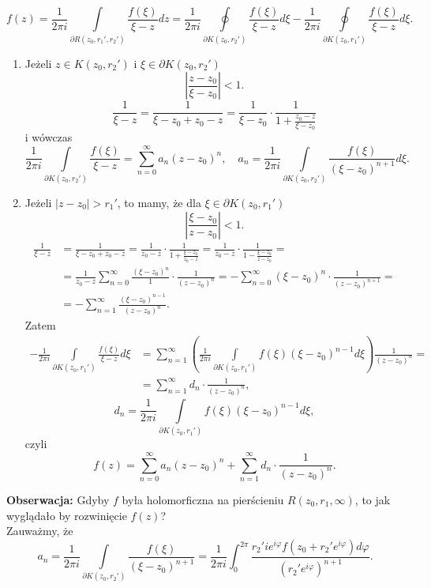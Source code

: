 \documentclass[../main.tex]{subfiles}
\begin{document}
    \[
        f(z) = \frac{1}{2\pi i}\int\limits_{\partial R(z_0,r_1',r_2')} \frac{f(\xi)}{\xi - z}dz = \frac{1}{2\pi i}\oint\limits_{\partial K(z_0,r_2')}\frac{f(\xi)}{\xi - z}d\xi - \frac{1}{2\pi i}\oint\limits_{\partial K(z_0,r_1')}\frac{f(\xi)}{\xi-z}d\xi
    .\]
\begin{enumerate}
    \item Jeżeli $z\in K(z_0,r_2')$ i $\xi\in\partial K(z_0,r_2')$
\[
    \left| \frac{z-z_0}{\xi-z_0} \right| < 1
.\]
\[
    \frac{1}{\xi - z} = \frac{1}{\xi - z_0 + z_0 - z} = \frac{1}{\xi - z_0}\cdot \frac{1}{1+ \frac{z_0-z}{\xi - z_0}}
\]
i wówczas
\[
    \frac{1}{2\pi i}\int\limits_{\partial K(z_0, r_2')}\frac{f(\xi)}{\xi - z} = \sum_{n=0}^{\infty} a_n (z-z_0)^n,\quad a_n = \frac{1}{2 \pi i}\int\limits_{\partial K(z_0,r_2')}\frac{f(\xi)}{(\xi - z_0)^{n+1}}d\xi
.\]
    \item Jeżeli $|z-z_0| > r_1'$, to mamy, że dla $\xi\in\partial K(z_0,r_1')$
        \[
            \left| \frac{\xi - z_0}{z-z_0} \right| < 1
        .\]
    \begin{align*}
        \frac{1}{\xi - z} &= \frac{1}{\xi - z_0 + z_0 - z} = \frac{1}{z_0 - z} \cdot \frac{1}{1 + \frac{\xi - z_0}{z_0 - z}} = \frac{1}{z_0 - z}\cdot \frac{1}{1 - \frac{\xi - z_0}{z - z_0}} =\\
        &= \frac{1}{z_0 - z}\sum_{n=0}^{\infty} \frac{(\xi - z_0)^n}{1} \cdot \frac{1}{(z-z_0)^n} = -\sum_{n=0}^{\infty} (\xi - z_0)^n \cdot \frac{1}{(z-z_0)^{n+1}} =\\
        &= -\sum_{n=1}^{\infty} \frac{(\xi - z_0)^{n-1}}{(z-z_0)^n}
    .\end{align*}
Zatem
\begin{align*}
    -\frac{1}{2\pi i}\int\limits_{\partial K(z_0,r_1')} \frac{f(\xi)}{\xi - z}d\xi &= \sum_{n=1}^{\infty} \left( \frac{1}{2\pi i }\int\limits_{\partial K(z_0,r_1')}f(\xi) (\xi - z_0)^{n-1}d\xi \right) \frac{1}{(z-z_0)^n} =\\
    &= \sum_{n=1}^{\infty} d_n \cdot \frac{1}{(z-z_0)^n}
,\end{align*}
\[
    d_n = \frac{1}{2\pi i}\int\limits_{\partial K(z_0,r_1')}f(\xi)(\xi - z_0)^{n-1}d\xi
,\]
czyli
\[
    f(z) = \sum_{n=0}^{\infty} a_n (z-z_0)^n + \sum_{n=1}^{\infty} d_n \cdot \frac{1}{(z-z_0)^n}
.\]
\end{enumerate}
\textbf{Obserwacja:} Gdyby $f$ była holomorficzna na pierścieniu $R(z_0,r_1,\infty)$, to jak wyglądało by rozwinięcie $f(z)$?\\
Zauważmy, że \[
    a_n = \frac{1}{2\pi i}\int\limits_{\partial K(z_0,r_2')}\frac{f(\xi)}{(\xi - z_0)^{n+1}} = \frac{1}{2\pi i}\int_0^{2\pi}\frac{r_2'ie^{i\varphi}f(z_0+r_2'e^{i\varphi})d\varphi}{(r_2'e^{i\varphi})^{n+1}}
.\]
\end{document}
